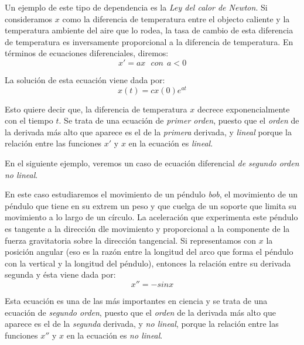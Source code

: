 \begin{example}\label{ex:calor}
Un ejemplo de este tipo de dependencia es la \emph{Ley del calor de Newton}. Si consideramos $x$ como la diferencia de temperatura entre el objecto caliente y la temperatura ambiente del aire que lo rodea, la tasa de cambio de esta diferencia de temperatura es inversamente proporcional a la diferencia de temperatura. En términos de ecuaciones diferenciales, diremos:
\begin{equation}
x' = ax~~~con~~ a<0
\end{equation}

La solución de esta ecuación viene dada por:
\begin{equation}
x(t) = c x(0)e^{at}
\end{equation}

Esto quiere decir que, la diferencia de temperatura $x$ decrece exponencialmente con el tiempo $t$. Se trata de una ecuación  de \emph{primer orden}, puesto que el \emph{orden} de la derivada más alto que aparece es el de la \emph{primera} derivada, y \emph{lineal} porque la relación entre las funciones $x'$ y $x$ en la ecuación es \emph{lineal}.
\end{example}

En el siguiente ejemplo, veremos un caso de ecuación diferencial \emph{de segundo orden} \emph{no lineal}.

\begin{example}[Péndulo]
En este caso estudiaremos el movimiento de un péndulo \emph{bob}, el movimiento de un péndulo que tiene en su extrem un peso y que cuelga de un soporte que limita su movimiento a lo largo de un círculo. La aceleración que experimenta este péndulo es tangente a la dirección dle movimiento y proporcional a la componente de la fuerza gravitatoria sobre la dirección tangencial. Si representamos con $x$ la posición angular (eso es la razón entre la longitud del arco que forma el péndulo con la vertical y la longitud del péndulo), entonces la relación entre su derivada segunda y ésta viene dada por:
\begin{equation}
x'' = -sinx
\end{equation}

Esta ecuación es una de las más importantes en ciencia y se trata de una ecuación de \emph{segundo orden}, puesto que el \emph{orden} de la derivada más alto que aparece es el de la \emph{segunda} derivada, y \emph \emph{no lineal}, porque la relación entre las funciones $x''$ y $x$ en la ecuación es \emph{no lineal}.
\end{example}


